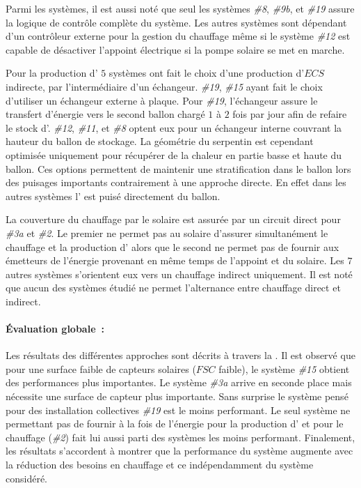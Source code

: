 Parmi les systèmes, il est aussi noté que seul les systèmes \emph{\#8}, \emph{\#9b},
et \emph{\#19} assure la logique de contrôle complète du système. Les autres systèmes
sont dépendant d’un contrôleur externe pour la gestion du chauffage même si le système
\emph{\#12} est capable de désactiver l’appoint électrique si la pompe solaire se met en marche.

Pour la production d’ $5$ systèmes ont fait le choix d’une production
d’$ECS$ indirecte, par l’intermédiaire d’un échangeur. \emph{\#19}, \emph{\#15} ayant fait le
choix d’utiliser un échangeur externe à plaque. Pour \emph{\#19}, l’échangeur
assure le transfert d’énergie vers le second ballon chargé $1$ à $2$ fois par jour afin
de refaire le stock d’. \emph{\#12}, \emph{\#11}, et \emph{\#8} optent eux pour
un échangeur interne couvrant la hauteur du ballon de stockage. La géométrie
du serpentin est cependant optimisée uniquement pour récupérer de la chaleur en
partie basse et haute du ballon. Ces options permettent de maintenir une
stratification dans le ballon lors des puisages importants contrairement à une approche
directe. En effet dans les autres systèmes l’ est puisé directement du ballon.

La couverture du chauffage par le solaire est assurée par un circuit direct pour
\emph{\#3a} et \emph{\#2}. Le premier ne permet pas au solaire d’assurer simultanément
le chauffage et la production d’ alors que le second ne permet pas de fournir
aux émetteurs de l’énergie provenant en même temps de l’appoint et du solaire.
Les $7$ autres systèmes s’orientent eux vers un chauffage indirect uniquement. Il est noté que
aucun des systèmes étudié ne permet l’alternance entre chauffage direct et indirect.

\paragraph{Évaluation globale~:} %
\label{par:evaluation_globale}
Les résultats des différentes approches sont décrits à travers la .
Il est observé que pour une surface faible de capteurs solaires ($FSC$ faible), le système \emph{\#15}
obtient des performances plus importantes. Le système \emph{\#3a} arrive en seconde place
mais nécessite une surface de capteur plus importante. Sans surprise le système pensé
pour des installation collectives \emph{\#19} est le moins performant. Le seul système
ne permettant pas de fournir à la fois de l’énergie pour la production d’
et pour le chauffage (\emph{\#2}) fait lui aussi parti des systèmes les moins performant.
Finalement, les résultats s’accordent à montrer que la performance du système augmente avec la réduction des
besoins en chauffage et ce indépendamment du système considéré.

